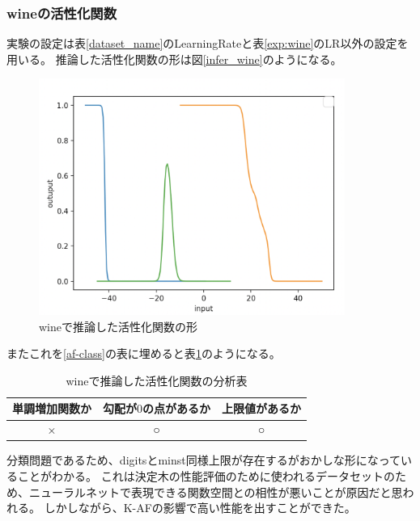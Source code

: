\subsubsection{wineの活性化関数}
実験の設定は表\ref{dataset_name}のLearningRateと表\ref{exp:wine}のLR以外の設定を用いる。
推論した活性化関数の形は図\ref{infer_wine}のようになる。
\begin{figure}[hbtp]
    \begin{center}
        \includegraphics[width=10cm]{asset/wine-0.01.png}
            \caption{wineで推論した活性化関数の形}
            \label{ifer_wine}
    \end{center}
\end{figure}

またこれを\ref{af-class}の表に埋めると表\ref{anal_wine}のようになる。
\begin{table}[htbp]
    \begin{center}
        \caption{wineで推論した活性化関数の分析表}
        \label{anal_wine}
        \vspace{2mm} 
        \begin{tabular}{ |c|c|c| }
        単調増加関数か & 勾配が$ 0 $の点があるか & 上限値があるか   \\
        \hline
        × & ○ & ○   \\
        \end{tabular}
    \end{center}
\end{table}


分類問題であるため、digitsとminst同様上限が存在するがおかしな形になっていることがわかる。
これは決定木の性能評価のために使われるデータセットのため、ニューラルネットで表現できる関数空間との相性が悪いことが原因だと思われる。
しかしながら、K-AFの影響で高い性能を出すことができた。






